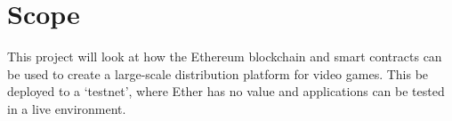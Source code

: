 \section{Scope}

This project will look at how the Ethereum blockchain and smart contracts can be used to create a large-scale distribution platform for video games. This be deployed to a `testnet', where Ether has no value and applications can be tested in a live environment.